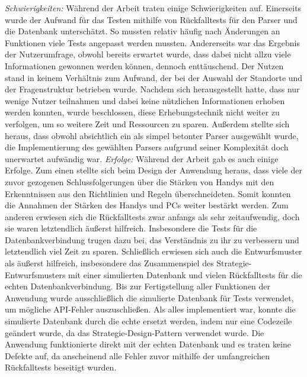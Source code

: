 \newline%
\myNewSection
\textit{Schwierigkeiten:}
Während der Arbeit traten einige Schwierigkeiten auf.
	Einerseits wurde der Aufwand für das Testen mithilfe von Rückfalltests für den Parser und die Datenbank unterschätzt. So mussten relativ häufig nach Änderungen an Funktionen viele Tests angepasst werden mussten.
	Andererseits war das Ergebnis der Nutzerumfrage, obwohl bereits erwartet wurde, dass dabei nicht allzu viele Informationen gewonnen werden können, dennoch enttäuschend. Der Nutzen stand in keinem Verhältnis zum Aufwand, der bei der Auswahl der Standorte und der Fragenstruktur betrieben wurde. Nachdem sich herausgestellt hatte, dass nur wenige Nutzer teilnahmen und dabei keine nützlichen Informationen erhoben werden konnten, wurde beschlossen, diese Erhebungstechnik nicht weiter zu verfolgen, um so weitere Zeit und Ressourcen zu sparen.
	Außerdem stellte sich heraus, dass obwohl absichtlich ein als \glqq simpel\grqq{} betonter Parser ausgewählt wurde, die Implementierung des gewählten Parsers aufgrund seiner Komplexität doch unerwartet aufwändig war.
\newline%
\myNewSection
\textit{Erfolge:}
Während der Arbeit gab es auch einige Erfolge.
	Zum einen stellte sich beim Design der Anwendung heraus, dass viele der zuvor gezogenen Schlussfolgerungen über die Stärken von Handys mit den Erkenntnissen aus den Richtlinien und Regeln überschneideten. Somit konnten die Annahmen der Stärken des Handys und PCs weiter bestärkt werden.
	Zum anderen erwiesen sich die Rückfalltests zwar anfangs als sehr zeitaufwendig, doch sie waren letztendlich äußerst hilfreich. Insbesondere die Tests für die Datenbankverbindung trugen dazu bei, das Verständnis zu ihr zu verbessern und letztendlich viel Zeit zu sparen.
	Schließlich erwiesen sich auch die Entwurfsmuster als äußerst hilfreich, insbesondere das Zusammenspiel des Strategie-Entwurfsmusters mit einer simulierten Datenbank und vielen Rückfalltests für die echten Datenbankverbindung. Bis zur Fertigstellung aller Funktionen der Anwendung wurde ausschließlich die simulierte Datenbank für Tests verwendet, um mögliche API-Fehler auszuschließen. Als alles implementiert war, konnte die simulierte Datenbank durch die echte ersetzt werden, indem nur eine Codezeile geändert wurde, da das Strategie-Design-Pattern verwendet wurde. Die Anwendung funktionierte direkt mit der echten Datenbank und es traten keine Defekte auf, da anscheinend alle Fehler zuvor mithilfe der umfangreichen Rückfalltests beseitigt wurden.
